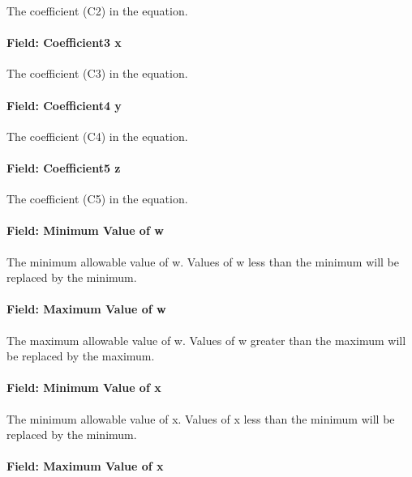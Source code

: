 The coefficient (C2) in the equation.

\paragraph{Field: Coefficient3 x}\label{field-coefficient3-x}

The coefficient (C3) in the equation.

\paragraph{Field: Coefficient4 y}\label{field-coefficient4-y}

The coefficient (C4) in the equation.

\paragraph{Field: Coefficient5 z}\label{field-coefficient5-z}

The coefficient (C5) in the equation.

\paragraph{Field: Minimum Value of w}\label{field-minimum-value-of-w}

The minimum allowable value of w. Values of w less than the minimum will be replaced by the minimum.

\paragraph{Field: Maximum Value of w}\label{field-maximum-value-of-w}

The maximum allowable value of w. Values of w greater than the maximum will be replaced by the maximum.

\paragraph{Field: Minimum Value of x}\label{field-minimum-value-of-x-1}

The minimum allowable value of x. Values of x less than the minimum will be replaced by the minimum.

\paragraph{Field: Maximum Value of x}\label{field-maximum-value-of-x-1}

